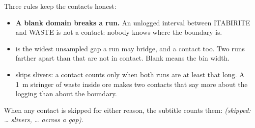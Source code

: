 Three rules keep the contacts honest:

\begin{itemize}
\item \textbf{A blank domain breaks a run.} An unlogged interval between ITABIRITE and WASTE is not a contact: nobody knows where the boundary is.
\item \textbf{} is the widest unsampled gap a run may bridge, and a contact too. Two runs farther apart than that are not in contact. Blank means the bin width.
\item \textbf{} skips slivers: a contact counts only when both runs are at least that long. A 1~m stringer of waste inside ore makes two contacts that say more about the logging than about the boundary.
\end{itemize}

When any contact is skipped for either reason, the subtitle counts them: \emph{(skipped: … slivers, … across a gap)}.

